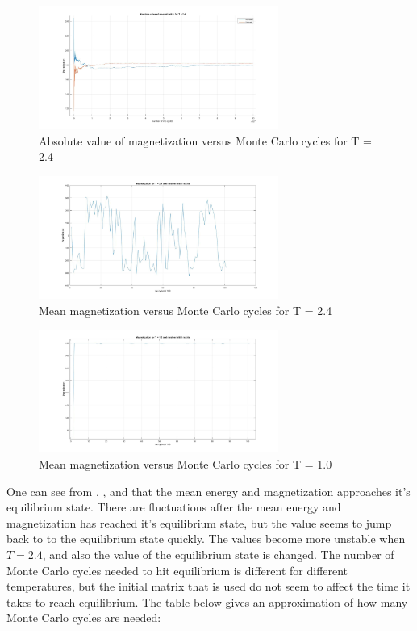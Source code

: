 \documentclass[10pt,a4paper]{article}
\begin{document}
\begin{figure}[H]
\centerline{
\includegraphics[width=0.7\textwidth]{absmag24T}
}
\caption{Absolute value of magnetization versus Monte Carlo cycles for T = 2.4}
\label{fig:absmag24T}
\end{figure}

\begin{figure}[H]
\centerline{
\includegraphics[width=0.7\textwidth]{magnetizationT24random}
}
\caption{Mean magnetization versus Monte Carlo cycles for T = 2.4}
\label{fig:mag24T}
\end{figure}
\begin{figure}[H]
\centerline{
\includegraphics[width=0.7\textwidth]{magnetizationT1random}
}
\caption{Mean magnetization versus Monte Carlo cycles for T = 1.0}
\label{fig:mag1T}
\end{figure}

\noindent One can see from , ,  and  that the mean energy and magnetization approaches it's equilibrium state. There are fluctuations after the mean energy and magnetization has reached it's equilibrium state, but the value seems to jump back to to the equilibrium state quickly. The values become more unstable when $T = 2.4$, and also the value of the equilibrium state is changed. The number of Monte Carlo cycles needed to hit equilibrium is different for different temperatures, but the initial matrix that is used do not seem to affect the time it takes to reach equilibrium. The table below gives an approximation of how many Monte Carlo cycles are needed:
\end{document}

